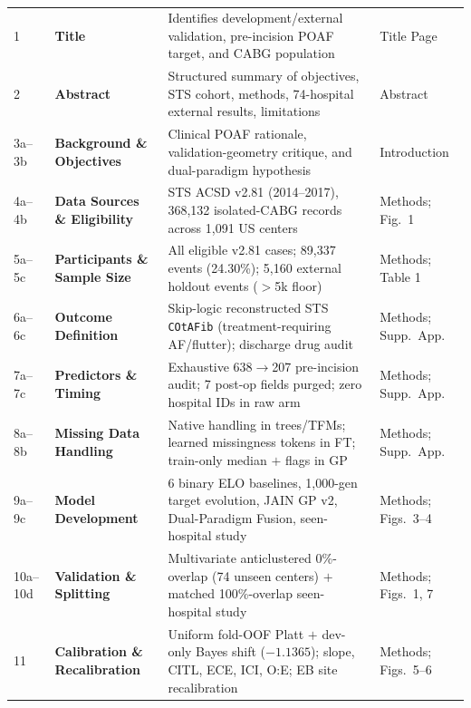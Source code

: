 \begin{table}[t]
\centering\tablefont
\caption{}
\label{tab:supp_tripod}
\setlength{\tabcolsep}{4.2pt}
\renewcommand{\arraystretch}{1.04}
\begin{tabularx}{\textwidth}{@{}L{1.15cm}L{3.1cm}YL{2.65cm}@{}}
\toprule
{} &  &  &  \\
 & \textbf{Title} & Identifies development/external validation, pre-incision POAF target, and CABG population & Title Page \\
2 & \textbf{Abstract} & Structured summary of objectives, STS cohort, methods, 74-hospital external results, limitations & Abstract \\
3a--3b & \textbf{Background \& Objectives} & Clinical POAF rationale, validation-geometry critique, and dual-paradigm hypothesis & Introduction \\
4a--4b & \textbf{Data Sources \& Eligibility} & STS ACSD v2.81 (2014--2017), 368,132 isolated-CABG records across 1,091 US centers & Methods; Fig.\ 1 \\
5a--5c & \textbf{Participants \& Sample Size} & All eligible v2.81 cases; 89,337 events (24.30\%); 5,160 external holdout events ($>$5k floor) & Methods; Table 1 \\
6a--6c & \textbf{Outcome Definition} & Skip-logic reconstructed STS \texttt{COtAFib} (treatment-requiring AF/flutter); discharge drug audit & Methods; Supp.\ App. \\
7a--7c & \textbf{Predictors \& Timing} & Exhaustive 638$\to$207 pre-incision audit; 7 post-op fields purged; zero hospital IDs in raw arm & Methods; Supp.\ App. \\
8a--8b & \textbf{Missing Data Handling} & Native handling in trees/TFMs; learned missingness tokens in FT; train-only median $+$ flags in GP & Methods; Supp.\ App. \\
9a--9c & \textbf{Model Development} & 6 binary ELO baselines, 1,000-gen target evolution, JAIN GP v2, Dual-Paradigm Fusion, seen-hospital study & Methods; Figs.\ 3--4 \\
10a--10d & \textbf{Validation \& Splitting} & Multivariate anticlustered 0\%-overlap (74 unseen centers) $+$ matched 100\%-overlap seen-hospital study & Methods; Figs.\ 1, 7 \\
11 & \textbf{Calibration \& Recalibration} & Uniform fold-OOF Platt $+$ dev-only Bayes shift ($-1.1365$); slope, CITL, ECE, ICI, O:E; EB site recalibration & Methods; Figs.\ 5--6 \\

\end{tabularx}
\end{table}
